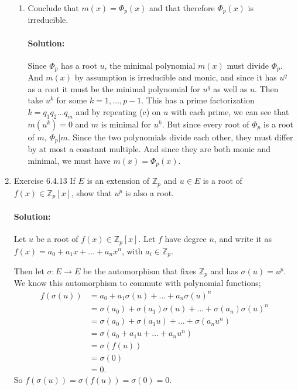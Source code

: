 \documentclass{article}
\begin{document}
\begin{enumerate}
\begin{enumerate}
\item Conclude that $m(x)=\Phi_p(x)$ and that therefore $\Phi_p(x)$ is irreducible.
    \paragraph{Solution:} Since $\Phi_p$ has a root $u$, the minimal polynomial $m(x)$ must divide $\Phi_p$.
    And $m(x)$ by assumption is irreducible and monic, and since it has $u^{q}$ as a root
    it must be the minimal polynomial for $u^{q} $ as well as $u$. Then take  $u^{k}$ for some 
    $k=1,\ldots,p-1$. This has a prime factorization $k=q_1q_2\ldots q_m$ and by repeating (c) on  $u$ with
    each prime, we can see that $m(u^{k})=0$ and $m$ is minimal for $u^{k}$.
    But since every root of $\Phi_p$ is a root of $m$, $\Phi_p|m$.
    Since the two polynomials divide each other, they must differ by at most a constant multiple.
    And since they are both monic and minimal, we must have $m(x)=\Phi_p(x)$.

\end{enumerate}

\newpage
\item Exercise 6.4.13 If $E$ is an extension of ${\mathbb Z}_p$ and $u\in E$ is a root of $f(x)\in {\mathbb Z}_p[x]$, show that $u^p$ is also a root.
    \paragraph{Solution:} Let $u$ be a root of $f(x)\in \mathbb{Z}_p[x]$. Let $f$ have degree $n$,
    and write it as $f(x)=a_0+a_1x+\ldots+a_nx^{n}$, with $a_i \in \mathbb{Z}_p$.

    Then let $\sigma:E\to E$ be the automorphism that fixes $\mathbb{Z}_p$ and has
    $\sigma(u)=u^{p}$. We know this automorphism to commute with polynomial functions;
    \begin{align*}
        f(\sigma(u))&= a_0+a_1\sigma(u)+\ldots+a_n\sigma(u)^{n}\\
        &=  \sigma(a_0)+\sigma(a_1)\sigma(u)+\ldots+\sigma(a_n)\sigma(u)^{n} \\
        &=  \sigma(a_0)+\sigma(a_1u)+\ldots+\sigma(a_nu^{n}) \\
        &=  \sigma(a_0+a_1u+\ldots+a_nu^{n}) \\
        &=  \sigma(f(u))\\
        &=\sigma(0)\\
        &=0
    .\end{align*}
    So $f(\sigma(u))=\sigma(f(u))=\sigma(0)=0$.


\end{enumerate}
\end{document}
